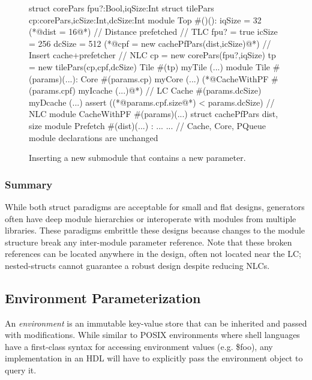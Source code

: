 \begin{figure}
\centering
\begin{phdl}
struct corePars {fpu?:Bool,iqSize:Int}
struct tilePars {cp:corePars,icSize:Int,dcSize:Int}
module Top #()():
  iqSize = 32
  (*@\textcolor[rgb]{1,0,0}{dist = 16}@*)    // Distance prefetched                            // TLC
  fpu? = true
  icSize = 256
  dcSize = 512
  (*@\textcolor[rgb]{1,0,0}{cpf = new cachePfPars(dist,icSize)}@*) // Insert cache+prefetcher  // NLC
  cp = new corePars(fpu?,iqSize)
  tp = new tilePars(cp,cpf,dcSize)
  Tile #(tp) myTile (...)
module Tile #(params)(...):
  Core  #(params.cp)  myCore   (...)
  (*@\textcolor[rgb]{1,0,0}{CacheWithPF \#(params.cpf) myIcache (...)}@*)                       // LC
  Cache #(params.dcSize) myDcache (...)
  assert ((*@\textcolor[rgb]{1,0,0}{params.cpf.size}@*) < params.dcSize)                       // NLC
module CacheWithPF #(params)(...)
struct cachePfPars {dist, size}
module Prefetch #(dist)(...) : ...
... // Cache, Core, PQueue module declarations are unchanged
\end{phdl} 
\caption{Inserting a new submodule that contains a new parameter.}
\label{fig:flatstruct-delta}
\end{figure}

\subsubsection{Summary}

While both struct paradigms are acceptable for small and flat designs, generators often have deep module hierarchies or interoperate with modules from multiple libraries. 
These paradigms embrittle these designs because changes to the module structure break any inter-module parameter reference. 
Note that these broken references can be located anywhere in the design, often not located near the LC; nested-structs cannot guarantee a robust design despite reducing NLCs.

\subsection{Environment Parameterization}
An \emph{environment} is an immutable key-value store that can be inherited and passed with modifications. While similar to POSIX environments where shell languages have a first-class syntax for accessing environment values (e.g. \$foo), any implementation in an HDL will have to explicitly pass the environment object to query it.

